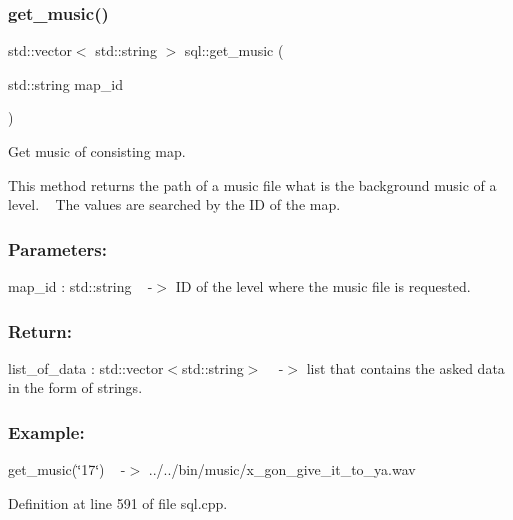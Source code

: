 \subsubsection{\texorpdfstring{get\+\_\+music()}{get\_music()}}
{\footnotesize\ttfamily std\+::vector$<$ std\+::string $>$ sql\+::get\+\_\+music (\begin{DoxyParamCaption}\item[{std\+::string}]{map\+\_\+id }\end{DoxyParamCaption})}



Get music of consisting map. 

This method returns the path of a music file what is the background music of a level. ~\newline
The values are searched by the ID of the map. ~\newline


\subsubsection*{Parameters\+: }

map\+\_\+id \+: std\+::string ~\newline
-\/$>$ ID of the level where the music file is requested.

\subsubsection*{Return\+: }

list\+\_\+of\+\_\+data \+: std\+::vector$<$std\+::string$>$ ~\newline
-\/$>$ list that contains the asked data in the form of strings.~\newline


\subsubsection*{Example\+: }

get\+\_\+music(\char`\"{}17\char`\"{}) ~\newline
-\/$>$ ../../bin/music/x\+\_\+gon\+\_\+give\+\_\+it\+\_\+to\+\_\+ya.wav 

Definition at line 591 of file sql.\+cpp.

